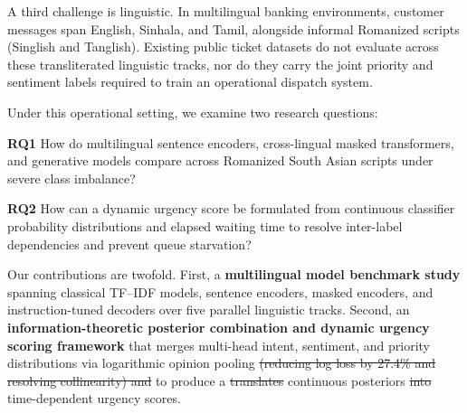 A third challenge is linguistic. In multilingual banking environments, customer messages span English, Sinhala, and Tamil, alongside informal Romanized scripts (Singlish and Tanglish). Existing public ticket datasets do not evaluate across these transliterated linguistic tracks, nor do they carry the joint priority and sentiment labels required to train an operational dispatch system.

Under this operational setting, we examine two research questions:

\textbf{RQ1} How do multilingual sentence encoders, cross-lingual masked transformers, and generative models compare across Romanized South Asian scripts under severe class imbalance? 

\textbf{RQ2} How can a dynamic urgency score be formulated from continuous classifier probability distributions and elapsed waiting time to resolve inter-label dependencies and prevent queue starvation?

Our contributions are twofold. First, a \textbf{multilingual model benchmark study} spanning classical TF--IDF models, sentence encoders, masked encoders, and instruction-tuned decoders over five parallel linguistic tracks. Second, an \textbf{information-theoretic posterior combination and dynamic urgency scoring framework} that merges multi-head intent, sentiment, and priority distributions via logarithmic opinion pooling \sout{(reducing log loss by 27.4\% and resolving collinearity) and} to produce a \sout{translates} continuous posteriors \sout{into} time-dependent urgency scores.
